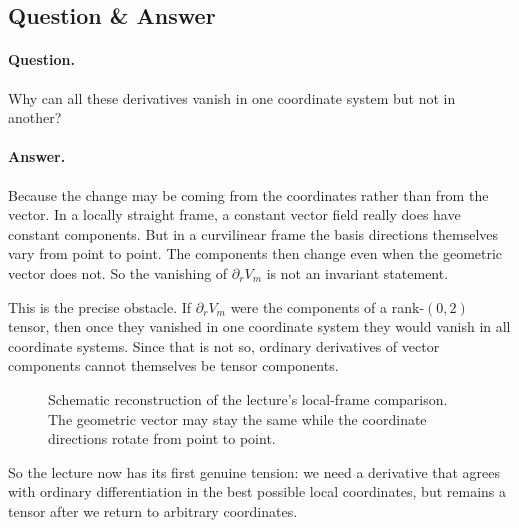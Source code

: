 \subsection{Question \& Answer}

\paragraph{Question.} Why can all these derivatives vanish in one coordinate system but not in another?

\paragraph{Answer.} Because the change may be coming from the coordinates rather than from the vector. In a locally straight frame, a constant vector field really does have constant components. But in a curvilinear frame the basis directions themselves vary from point to point. The components then change even when the geometric vector does not. So the vanishing of \(\partial_r V_m\) is not an invariant statement.

This is the precise obstacle. If \(\partial_r V_m\) were the components of a rank-\((0,2)\) tensor, then once they vanished in one coordinate system they would vanish in all coordinate systems. Since that is not so, ordinary derivatives of vector components cannot themselves be tensor components.

\begin{figure}[h]
\centering
{}
\caption{Schematic reconstruction of the lecture's local-frame comparison. The geometric vector may stay the same while the coordinate directions rotate from point to point.}
\end{figure}

So the lecture now has its first genuine tension: we need a derivative that agrees with ordinary differentiation in the best possible local coordinates, but remains a tensor after we return to arbitrary coordinates.

